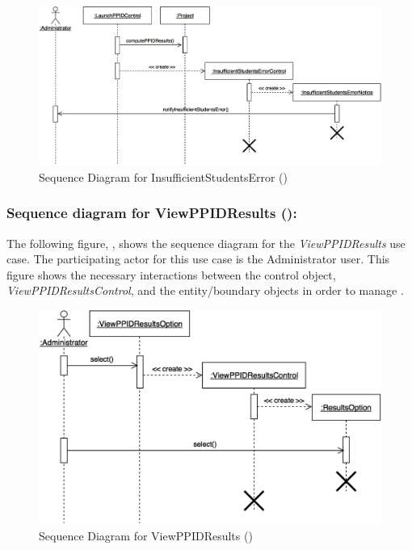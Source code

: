 \documentclass[12pt,letterpaper]{article}
\begin{document}
\begin{figure}[H]
	\centering{}
	\includegraphics[scale=0.27]{imgs/seq/insufficient-students-error.png}
	\caption[ - Sequence Diagram for InsufficientStudentsError]{Sequence Diagram for InsufficientStudentsError ()}
\end{figure}

\subsubsection*{Sequence diagram for ViewPPIDResults ():}

The following figure, , shows the sequence diagram for the {\it ViewPPIDResults} use case. The participating actor for this use case is
the Administrator user. This figure shows the necessary interactions between the control object, {\it ViewPPIDResultsControl}, and the
entity/boundary objects in order to manage .

\begin{figure}[H]
	\centering{}
	\includegraphics[scale=0.27]{imgs/seq/view-ppid-results.png}
	\caption[ - Sequence Diagram for ViewPPIDResults]{Sequence Diagram for ViewPPIDResults ()}
\end{figure}
\end{document}
